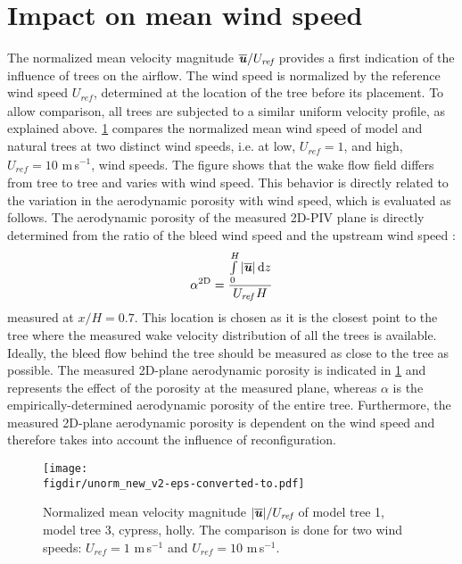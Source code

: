 \section{Impact on mean wind speed}

The normalized mean velocity magnitude $\overline{\textbf{\textit{u}}}/U_{\textit{ref}}$ provides a first indication of the influence of trees on the airflow. The wind speed is normalized by the reference wind speed $U_{\textit{ref}}$, determined at the location of the tree before its placement. To allow comparison, all trees are subjected to a similar uniform velocity profile, as explained above. \cref{fig:unorm} compares the normalized mean wind speed of model and natural trees at two distinct wind speeds, i.e. at low, $U_{\textit{ref}}=1$, and high, $U_{\textit{ref}}=10$ m\,s$^{-1}$, wind speeds. The figure shows that the wake flow field differs from tree to tree and varies with wind speed. This behavior is directly related to the variation in the aerodynamic porosity with wind speed, which is evaluated as follows. The aerodynamic porosity of the measured 2D-PIV plane is directly determined from the ratio of the bleed wind speed and the upstream wind speed \citep{Guan2003}:
\begin{equation}
\alpha^{\mathrm{2D}} = \frac{\int\limits_0^H { |{\overline{\textbf{\textit{u}}}}|\,\mathrm{d}z}}{U_{\textit{ref}} \, H}
\label{eq:2dporosity}
\end{equation}
measured at $x/H=0.7$. This location is chosen as it is the closest point to the tree where the measured wake velocity distribution of all the trees is available. Ideally, the bleed flow behind the tree should be measured as close to the tree as possible. The measured 2D-plane aerodynamic porosity is indicated in \cref{fig:unorm} and represents the effect of the porosity at the measured plane, whereas $\alpha$ is the empirically-determined aerodynamic porosity of the entire tree. Furthermore, the measured 2D-plane aerodynamic porosity is dependent on the wind speed and therefore takes into account the influence of reconfiguration.

	\begin{sidewaysfigure}[p]
	\centering
	\texttt{[image: \\figdir/unorm\_new\_v2-eps-converted-to.pdf]}
	\caption{Normalized mean velocity magnitude $|\overline{\textbf{\textit{u}}}|/U_{\textit{ref}}$ of  model tree 1,  model tree 3,  cypress,  holly. The comparison is done for two wind speeds:  $U_{\textit{ref}}=1$ m\,s$^{-1}$ and  $U_{\textit{ref}}=10$ m\,s$^{-1}$.}
	\label{fig:unorm}
	\end{sidewaysfigure}

